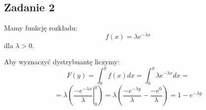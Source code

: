 \subsection{Zadanie 2}

Mamy funkcję rozkładu:
$$f(x) = \lambda e^{-\lambda x}$$
dla $ \lambda > 0.$ 

Aby wyznaczyć dystrybuantę liczymy:
$$ F(y)=\int_{0}^{y} f(x) dx = \int_{0}^{y}  \lambda e^{-\lambda x} dx =  $$
$$=\lambda(\left.\frac{-e^{-\lambda x}}{\lambda}\right|_0^y) = \lambda (\frac{-e^{-\lambda y}}{\lambda}-\frac{-e^{0}}{\lambda}) = 1- e^{-\lambda y} $$
